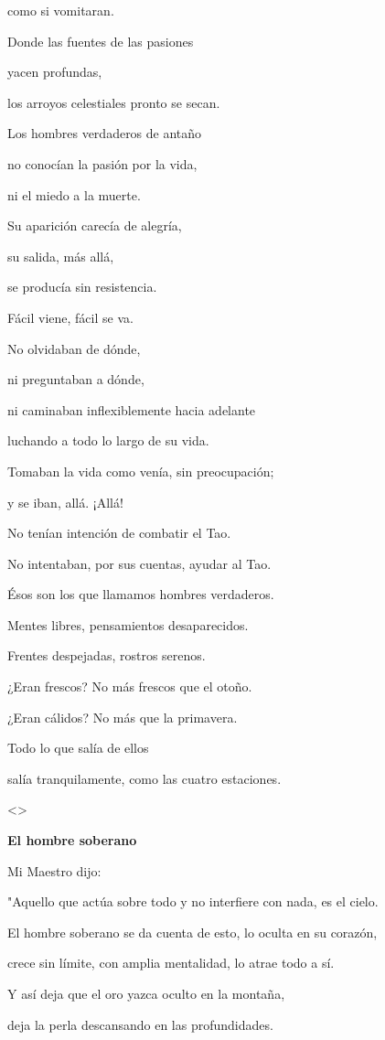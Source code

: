 como si vomitaran.

Donde las fuentes de las pasiones

yacen profundas,

los arroyos celestiales pronto se secan.

Los hombres verdaderos de antaño

no conocían la pasión por la vida,

ni el miedo a la muerte.

Su aparición carecía de alegría,

su salida, más allá,

se producía sin resistencia.

Fácil viene, fácil se va.

No olvidaban de dónde,

ni preguntaban a dónde,

ni caminaban inflexiblemente hacia adelante

luchando a todo lo largo de su vida.

Tomaban la vida como venía, sin preocupación;

y se iban, allá. ¡Allá!

No tenían intención de combatir el Tao.

No intentaban, por sus cuentas, ayudar al Tao.

Ésos son los que llamamos hombres verdaderos.

Mentes libres, pensamientos desaparecidos.

Frentes despejadas, rostros serenos.

¿Eran frescos? No más frescos que el otoño.

¿Eran cálidos? No más que la primavera.

Todo lo que salía de ellos

salía tranquilamente, como las cuatro estaciones.

\textless\textgreater{}

\textbf{{El hombre soberano}}

Mi Maestro dijo:

"Aquello que actúa sobre todo y no interfiere con nada, es el cielo.

El hombre soberano se da cuenta de esto, lo oculta en su corazón,

crece sin límite, con amplia mentalidad, lo atrae todo a sí.

Y así deja que el oro yazca oculto en la montaña,

deja la perla descansando en las profundidades.


